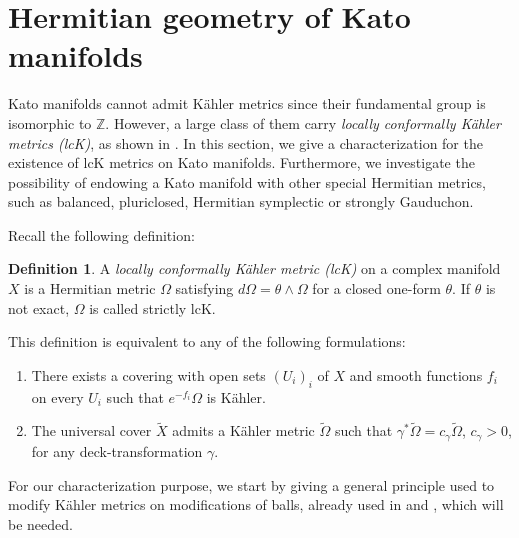\documentclass[JEP,XML,SOM,Unicode,NoFloatCountersInSection]{cedram}
\theoremstyle{definition}
\newtheorem{definition}[theorem]{Definition}
\let\wt\widetilde
\begin{document}
\section{Hermitian geometry of Kato manifolds}\label{metrici}

Kato manifolds cannot admit Kähler metrics since their fundamental group is isomorphic to $\mathbb{Z}$. However, a large class of them carry \emph{locally conformally Kähler metrics (lcK)}, as shown in \cite[Th.\,2.2]{iop}. In this section, we give a characterization for the existence of lcK metrics on Kato manifolds. Furthermore, we investigate the possibility of endowing a Kato manifold with other special Hermitian metrics, such as balanced, pluriclosed, Hermitian symplectic or strongly Gauduchon.

Recall the following definition:
\begin{definition}\label{deflck} A \emph{locally conformally Kähler metric (lcK)} on a complex manifold~$X$ is a Hermitian metric $\Omega$ satisfying $d\Omega=\theta\wedge\Omega$ for a closed one-form $\theta$. If $\theta$ is not exact, $\Omega$ is called strictly lcK.
\end{definition}

This definition is equivalent to any of the following formulations:
\begin{enumerate}
\item There exists a covering with open sets $(U_i)_i$ of $X$ and smooth functions $f_i$ on every $U_i$ such that $e^{-f_i}\Omega$ is Kähler.
\item The universal cover $\wt{X}$ admits a Kähler metric $\wt{\Omega}$ such that $\gamma^*\wt{\Omega}=c_{\gamma}\wt{\Omega}$, $c_{\gamma}>0$, for any deck-transformation $\gamma$.
\end{enumerate}

For our characterization purpose, we start by giving a general principle used to modify Kähler metrics on modifications of balls, already used in \cite{bru} and \cite{iop}, which will be needed.
\end{document}
